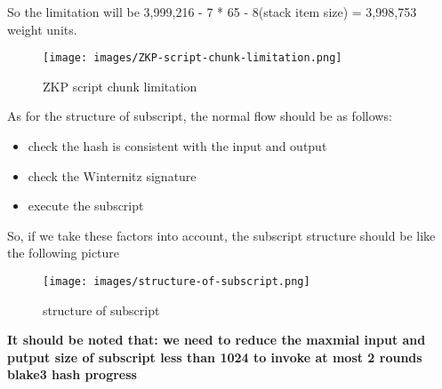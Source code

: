So the limitation will be 3,999,216 - 7 * 65 - 8(stack item size) = 3,998,753 weight units.

\begin{figure}[ht] 
    \centering  
    \texttt{[image: images/ZKP-script-chunk-limitation.png]} 
    \caption{ZKP script chunk limitation}
    \label{fig:ZKP-script-chunk-limitation}
\end{figure}

As for the structure of subscript, the normal flow should be as follows:

\begin{itemize}
    \item check the hash \cite{website:blake3} is consistent with the input and output
    \item check the Winternitz \cite{website:witernitz} signature
    \item execute the subscript
\end{itemize}

So, if we take these factors into account, the subscript structure should be like the following picture

\begin{figure}[ht] 
    \centering  
    \texttt{[image: images/structure-of-subscript.png]} 
    \caption{structure of subscript}
    \label{fig:structure of subscript}
\end{figure}

\textbf{It should be noted that: we need to reduce the maxmial input and putput size of subscript less than 1024 to invoke at most 2 rounds blake3 \cite{website:blake3} hash progress}
